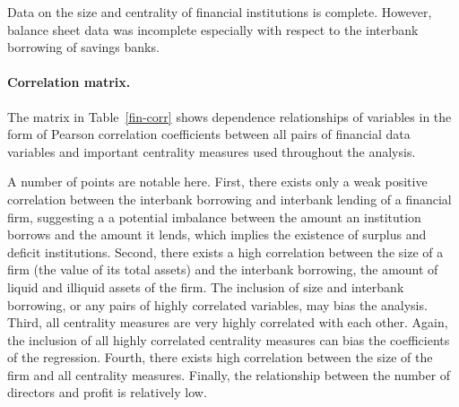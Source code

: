 Data on the size and centrality of financial institutions is complete. However, balance sheet data was incomplete especially with respect to the interbank borrowing of savings banks.

\paragraph{Correlation matrix.}

The matrix in Table~\ref{fin-corr} shows dependence relationships of variables in the form of Pearson correlation coefficients between all pairs of financial data variables and important centrality measures used throughout the analysis.

A number of points are notable here. First, there exists only a weak positive correlation between the interbank borrowing and interbank lending of a financial firm, suggesting a a potential imbalance between the amount an institution borrows and the amount it lends, which implies the existence of surplus and deficit institutions. Second, there exists a high correlation between the size of a firm (the value of its total assets) and the interbank borrowing, the amount of liquid and illiquid assets of the firm. The inclusion of size and interbank borrowing, or any pairs of highly correlated variables, may bias the analysis. Third, all centrality measures are very highly correlated with each other. Again, the inclusion of all highly correlated centrality measures can bias the coefficients of the regression. Fourth, there exists high correlation between the size of the firm and all centrality measures. Finally, the relationship between the number of directors and profit is relatively low.

